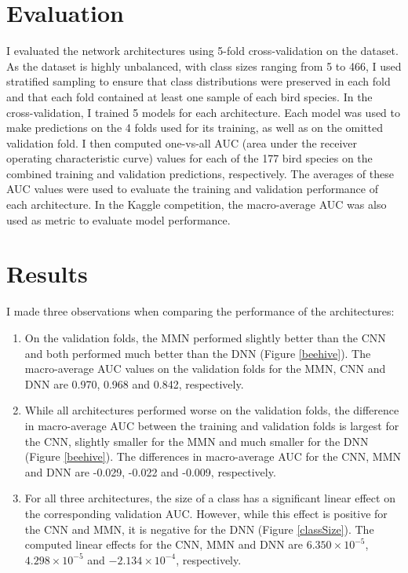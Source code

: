 \documentclass[12pt,twoside]{scrreport}
\begin{document}
\section*{Evaluation}
I evaluated the network architectures using 5-fold cross-validation on the dataset. As the dataset is highly unbalanced, with class sizes ranging from 5 to 466, I used stratified sampling to ensure that class distributions were preserved in each fold and that each fold contained at least one sample of each bird species. In the cross-validation, I trained 5 models for each architecture. Each model was used to make predictions on the 4 folds used for its training, as well as on the omitted validation fold. I then computed one-vs-all AUC (area under the receiver operating characteristic curve) values for each of the 177 bird species on the combined training and validation predictions, respectively. The averages of these AUC values were used to evaluate the training and validation performance of each architecture. In the Kaggle competition, the macro-average AUC was also used as metric to evaluate model performance.

\section*{Results}
I made three observations when comparing the performance of the architectures: 
\begin{enumerate}
 \item On the validation folds, the MMN performed slightly better than the CNN and both performed much better than the DNN (Figure \ref{beehive}). The macro-average AUC values on the validation folds for the MMN, CNN and DNN are 0.970, 0.968 and 0.842, respectively.
 \item While all architectures performed worse on the validation folds, the difference in macro-average AUC between the training and validation folds is largest for the CNN, slightly smaller for the MMN and much smaller for the DNN (Figure \ref{beehive}). The differences in macro-average AUC for the CNN, MMN and DNN are -0.029, -0.022 and -0.009, respectively.
 \item For all three architectures, the size of a class has a significant linear effect on the corresponding validation AUC. However, while this effect is positive for the CNN and MMN, it is negative for the DNN (Figure \ref{classSize}). The computed linear effects for the CNN, MMN and DNN are $6.350\times10^{-5}$, $4.298\times10^{-5}$ and $-2.134\times10^{-4}$, respectively.
\end{enumerate}
\end{document}
